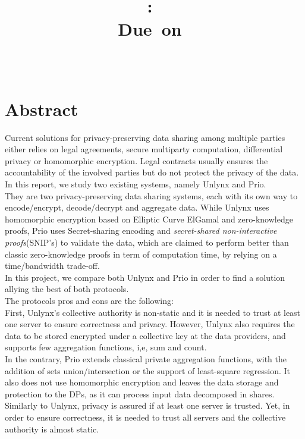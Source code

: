 \documentclass{article}
\title{
\logoepfl
\vspace{2in}
\textmd{\textbf{\hmwkClass:\ \hmwkTitle}}\\
\normalsize\vspace{0.1in}\small{Due\ on\ \hmwkDueDate}\\
\vspace{0.1in}\large{\textit{\hmwkClassInstructor\ \hmwkClassTime}}
\author{\textbf{\hmwkAuthorName}}
\vspace{3in}
}
\begin{document}
\maketitle

\newpage
\section*{Abstract}
Current solutions for privacy-preserving data sharing among multiple parties either relies on legal agreements, secure multiparty computation, differential privacy or homomorphic encryption. Legal contracts usually ensures the accountability of the involved parties but do not protect the privacy of the data.
In this report, we study two existing systems, namely Unlynx and Prio.\\
They are two privacy-preserving data sharing systems, each with its own way to encode/encrypt, decode/decrypt and aggregate data. While Unlynx \cite{unlynx} uses homomorphic encryption based on Elliptic Curve ElGamal and zero-knowledge proofs, Prio \cite{prio} uses Secret-sharing encoding and \textit{secret-shared non-interactive proofs}(SNIP's) to validate the data, which are claimed to perform better than classic zero-knowledge proofs \cite{proof1,proof2} in term of computation time, by relying on a time/bandwidth trade-off.\\
In this project, we compare both Unlynx and Prio in order to find a solution allying the best of both protocols.\\
The protocols pros and cons are the following:\\
First, Unlynx's collective authority is non-static and it is needed to trust at least one server to ensure correctness and privacy. However, Unlynx also requires the data to be stored encrypted under a collective key at the data providers, and supports few aggregation functions, i,e, sum and count.\\
In the contrary, Prio extends classical private aggregation functions, with the addition of sets union/intersection or the support of least-square regression. It also does not use homomorphic encryption and leaves the data storage and protection to the DPs, as it can process input data decomposed in shares. Similarly to Unlynx, privacy is assured if at least one server is trusted.
Yet, in order to ensure correctness, it is needed to trust all servers and the collective authority is almost static.\\
\end{document}
